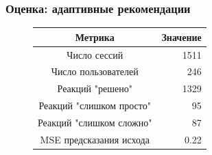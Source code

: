 \documentclass{beamer}
\begin{document}
\begin{frame}\frametitle{Оценка: адаптивные рекомендации}
\bigskip
\normalsize
    \begin{figure}
    \begin{table}
        \centering
        \begin{tabular}{c | r}
          \hline
          Метрика & Значение \\
          \hline	
          \hline	
          Число сессий & 1511 \\
          Число пользователей & 246 \\
          Реакций "решено" & 1329 \\
          Реакций "слишком просто" & 95 \\ 
          Реакций "слишком сложно" & 87 \\
          MSE предсказания исхода & 0.22 \\
          
         \hline  
        \end{tabular}
    \end{table}
    
      \centering
      \hfill
    \end{figure}
\end{frame}
\end{document}
